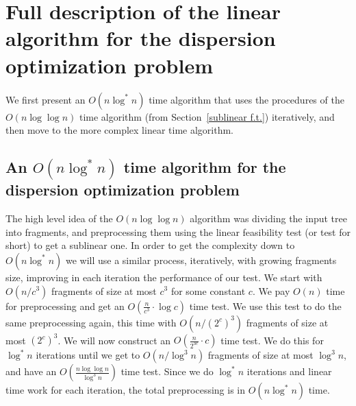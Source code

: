\documentclass[a4paper,UKenglish]{lipics-v2016}
\theoremstyle{plain}
\begin{document}
\section{Full description of the linear algorithm for the dispersion optimization problem}\label{appendix linear algorithm for the dispersion optimization problem}

We first present an $O(n \log^* n)$ time algorithm that uses the procedures of the $O(n \log \log n)$ time algorithm (from Section~\ref{sublinear f.t.}) iteratively, and then move to the more complex linear time algorithm.

\subsection{An \texorpdfstring{\boldmath$O(n\log^{*}n)$}{O(nlog^*n)} time algorithm for the dispersion optimization problem} \label{sectionlog*}
The high level idea of the $O(n \log \log n)$ algorithm was dividing the input tree into fragments, and preprocessing them using the linear feasibility test (or test for short) to get a sublinear one. In order to get the complexity down to $O(n \log ^*n)$ we will use a similar process, iteratively, with growing fragments size, improving in each iteration the performance of our test.
We start with $O(n/c^{3})$ fragments of size at most $c^3$ for some constant $c$.
We pay $O(n)$ time for preprocessing and get an $O(\frac{n}{c^3} \cdot \log c)$ time test.
We use this test to do the same preprocessing again, this time with $O(n/(2^{c})^{3})$ fragments of size at most $(2^c)^3$.
We will now construct an $O(\frac{n}{2^{3c}} \cdot c)$ time test.
We do this for $\log ^*n$ iterations until we get to $O(n/\log^{3}n)$ fragments of size at most $\log ^3n$, and have
an $O(\frac{n \log \log n}{\log ^3n})$ time test. Since we do $\log ^*n$ iterations and linear time work for each
iteration, the total preprocessing is in $O(n \log ^*n)$ time.
\end{document}
